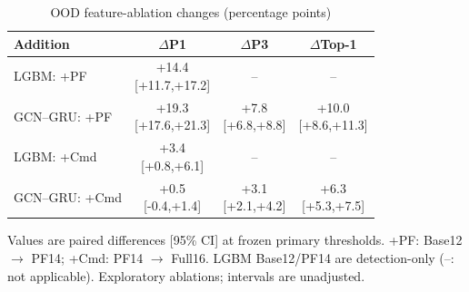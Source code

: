 \begin{table}[!t]
\caption{OOD feature-ablation changes (percentage points)}
\label{tab:feature_ablation}
\centering
\scriptsize
\setlength{\tabcolsep}{3.0pt}
\renewcommand{\arraystretch}{1.05}
\begin{tabular}{@{}lccc@{}}
\toprule
\textbf{Addition} & \textbf{$\Delta$P1} & \textbf{$\Delta$P3} & \textbf{$\Delta$Top-1} \\
\midrule
LGBM: +PF & \shortstack{+14.4\\{[+11.7,+17.2]}} & -- & -- \\
GCN--GRU: +PF & \shortstack{+19.3\\{[+17.6,+21.3]}} & \shortstack{+7.8\\{[+6.8,+8.8]}} & \shortstack{+10.0\\{[+8.6,+11.3]}} \\
\addlinespace[2pt]\midrule
LGBM: +Cmd & \shortstack{+3.4\\{[+0.8,+6.1]}} & -- & -- \\
GCN--GRU: +Cmd & \shortstack{+0.5\\{[-0.4,+1.4]}} & \shortstack{+3.1\\{[+2.1,+4.2]}} & \shortstack{+6.3\\{[+5.3,+7.5]}} \\
\bottomrule
\end{tabular}
\vspace{2pt}
\par\vspace{2pt}
\begin{minipage}{0.98\columnwidth}
\fontsize{6.7}{7.6}\selectfont
Values are paired differences [95\% CI] at frozen primary thresholds.
+PF: Base12 $\to$ PF14; +Cmd: PF14 $\to$ Full16.
LGBM Base12/PF14 are detection-only (--: not applicable).
Exploratory ablations; intervals are unadjusted.
\end{minipage}
\end{table}
